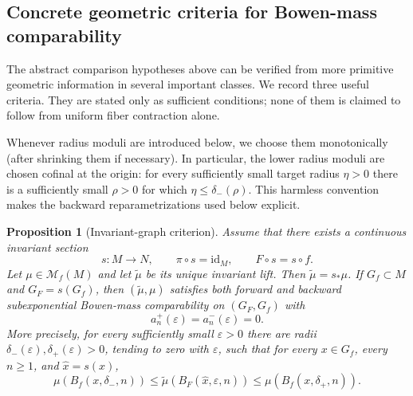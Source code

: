 \documentclass[11pt,a4paper]{article}
\newtheorem{proposition}[theorem]{Proposition}
\newcommand{\M}{\mathcal M}
\newcommand{\eps}{\varepsilon}
\begin{document}
\subsection{Concrete geometric criteria for Bowen-mass comparability}

The abstract comparison hypotheses above can be verified from more primitive
geometric information in several important classes. We record three useful
criteria. They are stated only as sufficient conditions; none of them is
claimed to follow from uniform fiber contraction alone.

Whenever radius moduli are introduced below, we choose them monotonically
(after shrinking them if necessary). In particular, the lower radius moduli
are chosen cofinal at the origin: for every sufficiently small target radius
$\eta>0$ there is a sufficiently small $\rho>0$ for which
$\eta\le\delta_-(\rho)$. This harmless convention makes the backward
reparametrizations used below explicit.

\begin{proposition}[Invariant-graph criterion]
\label{prop:invariant-graph-bowen}
Assume that there exists a continuous invariant section
\[
s:M\longrightarrow N,
\qquad \pi\circ s=\mathrm{id}_M,
\qquad F\circ s=s\circ f.
\]
Let $\mu\in\M_f(M)$ and let $\widetilde\mu$ be its unique invariant lift.
Then $\widetilde\mu=s_*\mu$. If $G_f\subset M$ and $G_F=s(G_f)$, then
$(\widetilde\mu,\mu)$ satisfies both forward and backward subexponential
Bowen-mass comparability on $(G_F,G_f)$ with
\[
a_n^+(\eps)=a_n^-(\eps)=0.
\]
More precisely, for every sufficiently small $\eps>0$ there are radii
$\delta_-(\eps),\delta_+(\eps)>0$, tending to zero with $\eps$, such that for
every $x\in G_f$, every $n\ge1$, and $\hat x=s(x)$,
\[
\mu(B_f(x,\delta_-,n))
\le
\widetilde\mu(B_F(\hat x,\eps,n))
\le
\mu(B_f(x,\delta_+,n)).
\]
\end{proposition}
\end{document}

